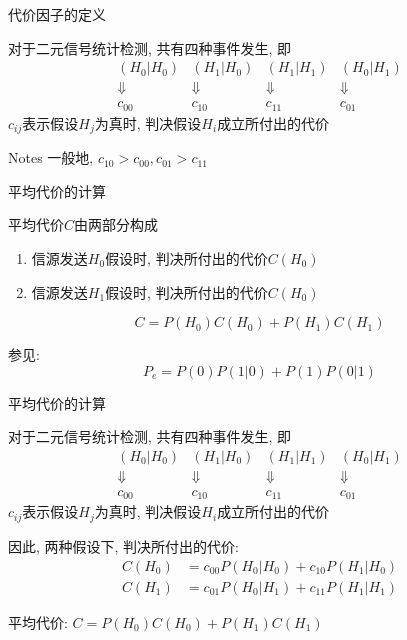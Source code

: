 \begin{frame}{代价因子的定义}
\begin{block}{对于二元信号统计检测, 共有四种事件发生, 即}
$$
\begin{array}{cccc}
	(H_0|H_0) & (H_1|H_0) & (H_1|H_1) & (H_0|H_1)\\
	\Downarrow & \Downarrow & \Downarrow & \Downarrow\\
	c_{00} & c_{10} & c_{11} & c_{01}
\end{array}
$$
$c_{ij}$表示假设$H_j$为真时, 判决假设$H_i$成立所付出的代价
\end{block}
\begin{block}{Notes}
	一般地, $c_{10}>c_{00}, c_{01}>c_{11}$
\end{block}
\end{frame}

\begin{frame}{平均代价的计算}
\begin{block}{平均代价$C$由两部分构成}
	\begin{enumerate}
		\item 信源发送$H_0$假设时, 判决所付出的代价$C(H_0)$
		\item 信源发送$H_1$假设时, 判决所付出的代价$C(H_0)$
	\end{enumerate}
    \[C=P(H_0)C(H_0)+P(H_1)C(H_1)\]
\end{block}
参见:
\[ P_e=P(0)P(1|0)+P(1)P(0|1)\]
\end{frame}

\begin{frame}{平均代价的计算}
\begin{block}{对于二元信号统计检测, 共有四种事件发生, 即}
	$$
	\begin{array}{cccc}
	(H_0|H_0) & (H_1|H_0) & (H_1|H_1) & (H_0|H_1)\\
	\Downarrow & \Downarrow & \Downarrow & \Downarrow\\
	c_{00} & c_{10} & c_{11} & c_{01}
	\end{array}
	$$
	$c_{ij}$表示假设$H_j$为真时, 判决假设$H_i$成立所付出的代价
\end{block}
\begin{block}{因此, 两种假设下, 判决所付出的代价: }
   \begin{align*}
   C(H_0)&=c_{00}P(H_0|H_0)+c_{10}P(H_1|H_0)\\
   C(H_1)&=c_{01}P(H_0|H_1)+c_{11}P(H_1|H_1)
   \end{align*}
\end{block}
 平均代价: $C=P(H_0)C(H_0)+P(H_1)C(H_1)$
\end{frame}

